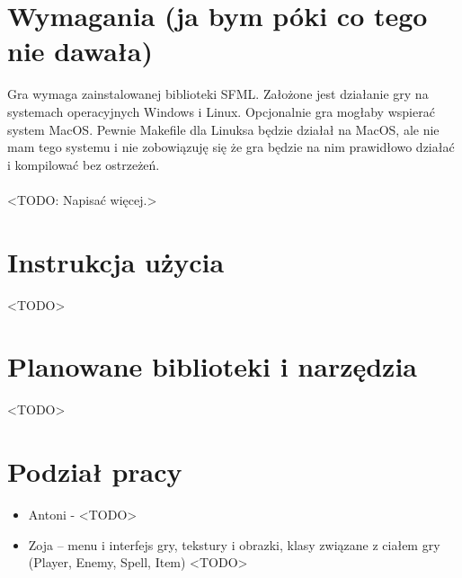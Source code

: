 \documentclass[12pt, titlepage]{article}
\begin{document}
\section{Wymagania (ja bym póki co tego nie dawała)}
Gra wymaga zainstalowanej biblioteki
SFML. Założone jest działanie gry
na systemach operacyjnych Windows i
Linux. Opcjonalnie gra mogłaby wspierać
system MacOS. Pewnie Makefile dla Linuksa
będzie działał na MacOS, ale nie mam tego
systemu i nie zobowiązuję się że gra będzie
na nim prawidłowo działać i kompilować
bez ostrzeżeń.
\\~\\
<TODO: Napisać więcej.>

\section{Instrukcja użycia}
<TODO>

\section{Planowane biblioteki i narzędzia}
<TODO>

\section{Podział pracy}
\begin{itemize}
	\item Antoni - <TODO>
 
	\item Zoja – menu i interfejs gry, tekstury i obrazki, klasy związane z ciałem gry (Player, Enemy, Spell, Item) <TODO>
\end{itemize}
\end{document}
